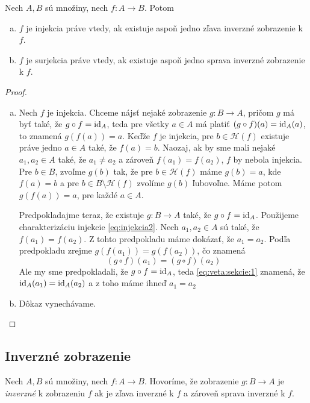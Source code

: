 \begin{veta}\label{veta:sekcie}
Nech $A,B$ sú množiny, nech $f\colon A\to B$. Potom
\begin{enumerate}[(a)]
\item $f$ je injekcia práve vtedy, ak existuje aspoň jedno zľava inverzné zobrazenie k $f$.
\item $f$ je surjekcia práve vtedy, ak existuje aspoň jedno sprava inverzné zobrazenie k $f$.
\end{enumerate}
\end{veta}
\begin{proof}~
\begin{enumerate}[(a)]
\item Nech $f$ je injekcia. Chceme nájsť nejaké zobrazenie $g\colon B\to A$, pričom $g$ má byť také,
že $g\circ f=\mathrm{id}_A$, teda pre všetky $a\in A$ má platiť
$(g\circ f)(a)=\mathrm{id}_A(a)$, to znamená $g(f(a))=a$. Keďže $f$ je injekcia, pre $b\in\mathcal H(f)$ existuje práve jedno
$a\in A$ také, že $f(a)=b$. Naozaj, ak by sme mali nejaké $a_1,a_2\in A$ také, že $a_1\neq a_2$ a zároveň
$f(a_1)=f(a_2)$, $f$ by nebola injekcia.
Pre $b\in B$, zvoľme $g(b)$ tak, že pre $b\in\mathcal H(f)$ máme $g(b)=a$, kde $f(a)=b$ a pre $b\in B\setminus\mathcal
H(f)$ zvolíme $g(b)$ ľubovoľne. Máme potom $g(f(a))=a$, pre každé $a\in A$.

Predpokladajme teraz, že existuje $g\colon B\to A$ také, že $g\circ f=\mathrm{id}_A$. Použijeme
charakterizáciu injekcie \eqref{eq:injekcia2}. Nech $a_1,a_2\in A$ sú také, že $f(a_1)=f(a_2)$. Z tohto
predpokladu máme dokázať, že $a_1=a_2$.
Podľa predpokladu zrejme $g(f(a_1))=g(f(a_2))$, čo znamená 
\begin{equation}\label{eq:veta:sekcie:1}
(g\circ f)(a_1)=(g\circ f)(a_2)\tag{*}
\end{equation}
Ale my sme predpokladali, že
$g\circ f=\mathrm{id}_A$, teda \eqref{eq:veta:sekcie:1} znamená, že $\mathrm{id}_A(a_1)=\mathrm{id}_A(a_2)$ a z toho máme ihneď
$a_1=a_2$
\item Dôkaz vynechávame.
\end{enumerate}
\end{proof}

\subsection{Inverzné zobrazenie}

\begin{definition}\label{def:inverzneZobrazenie}
Nech $A,B$ sú množiny, nech $f\colon A\to B$. Hovoríme, že zobrazenie $g\colon B\to A$ je
\emph{inverzné} k zobrazeniu $f$ ak je zľava inverzné k $f$ a zároveň sprava inverzné k $f$.
\end{definition}

